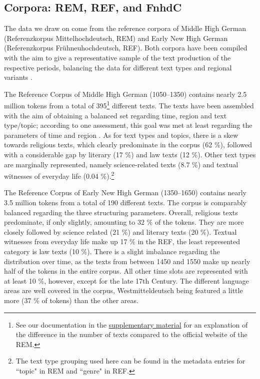 \documentclass[output=paper,colorlinks,citecolor=brown]{langscibook}
\begin{document}
\subsection{Corpora: REM, REF, and FnhdC} \label{sec:hs:corpora}
The data we draw on come from the reference corpora of Middle High German (Referenzkorpus Mittelhochdeutsch, REM) and Early New High German (Referenzkorpus Frühneuhochdeutsch, REF). Both corpora have been compiled with the aim to give a representative sample of the text production of the respective periods, balancing the data for different text types and regional variants \citep[see e.g.][]{dipperHistorischeLinguistik202018}. 

The Reference Corpus of Middle High German (1050--1350) \citep{kleinReferenzkorpusMittelhochdeutsch105013502016} contains nearly 2.5 million tokens from a total of 395\footnote{See our documentation in the \hyperref[sec:hs:dataavailability]{supplementary material} for an explanation of the difference in the number of texts compared to the official website of the REM.} different texts. The texts have been assembled with the aim of obtaining a balanced set regarding time, region and text type/topic; according to one assessment, this goal was met at least regarding the parameters of time and region \citep[see][p.6]{kopfKorpusKorpusHerausforderungen2019}. As for text types and topics, there is a skew towards religious texts, which clearly predominate in the corpus (62 \%), followed with a considerable gap by literary (17 \%) and law texts (12 \%). Other text types are marginally represented, namely science-related texts 
(8.7 \%) and textual witnesses of everyday life (0.04 \%).\footnote{The text type grouping used here can be found in the metadata entries for ``topic" in REM and ``genre" in REF.}

The Reference Corpus of Early New High German (1350--1650) \citep{wegeraReferenzkorpusFruhneuhochdeutsch135016502021} contains nearly 3.5 million tokens from a total of 190 different texts. The corpus is comparably balanced regarding the three structuring parameters. Overall, religious texts predominate, if only slightly, amounting to 32 \% of the tokens. They are more closely followed by science related (21 \%) and literary texts (20 \%). Textual witnesses from everyday life make up 17 \% in the REF, the least represented category is law texts (10 \%).
There is a slight imbalance regarding the distribution over time, as the texts from between 1450 and 1550 make up nearly half of the tokens in the entire corpus. All other time slots are represented with at least 10 \%, however, except for the late 17th Century. The different language areas are well covered in the corpus, Westmitteldeutsch being featured a little more (37 \% of tokens) than the other areas.
\end{document}
